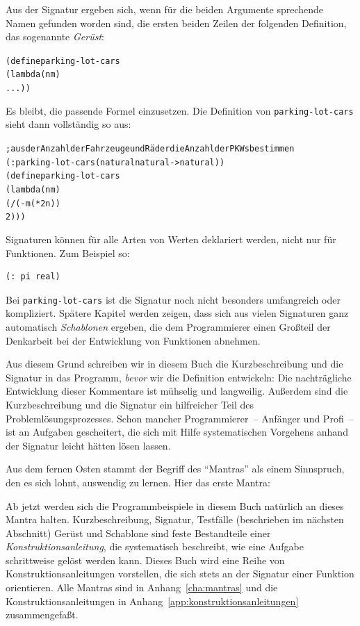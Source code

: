 Aus der Signatur ergeben sich, wenn für die beiden Argumente
sprechende Namen gefunden worden sind, die ersten beiden Zeilen der folgenden
Definition, das sogenannte \textit{Gerüst}:
%
\begin{alltt}
(define parking-lot-cars
  (lambda (n m)
    ...))
\end{alltt}
%
Es bleibt, die passende Formel einzusetzen.  Die Definition
von \texttt{parking-lot-cars} sieht dann vollständig so aus:
%
\begin{alltt}
; aus der Anzahl der Fahrzeuge und Räder die Anzahl der PKWs bestimmen
(: parking-lot-cars (natural natural -> natural))
(define parking-lot-cars
  (lambda (n m)
    (/ (- m (* 2 n))
       2)))
\end{alltt}
%
Signaturen können für alle Arten von Werten deklariert werden, nicht
nur für Funktionen.  Zum Beispiel so:
%
\begin{verbatim}
(: pi real)
\end{verbatim}
%
Bei \texttt{parking-lot-cars} ist die Signatur noch nicht besonders
umfangreich oder kompliziert.
Spätere Kapitel werden zeigen, dass sich aus vielen Signaturen ganz
automatisch \textit{Schablonen} ergeben, die dem
Programmierer einen Großteil der Denkarbeit bei der Entwicklung von
Funktionen abnehmen.

Aus diesem Grund schreiben wir in diesem Buch die
Kurzbeschreibung und die Signatur in das Programm, \emph{bevor} wir
die Definition entwickeln: 
Die
nachträgliche Entwicklung dieser Kommentare ist mühselig und
langweilig.  Außerdem sind die Kurzbeschreibung und die
Signatur ein hilfreicher Teil des Problemlösungsprozesses.
Schon mancher Programmierer~-- Anfänger und Profi~--
ist an Aufgaben gescheitert, die sich mit Hilfe systematischen Vorgehens
anhand der Signatur leicht hätten lösen lassen.

Aus dem fernen Osten stammt der Begriff des "`Mantras"' als einem
Sinnspruch, den es sich lohnt, auswendig zu lernen.  Hier das erste Mantra:
%
\begin{mantra}\label{mantra:contract}

\end{mantra}
%
Ab jetzt werden sich die Programmbeispiele in diesem Buch natürlich
an dieses Mantra halten.  Kurzbeschreibung, Signatur, Testfälle
(beschrieben im nächsten Abschnitt) Gerüst und
Schablone sind feste Bestandteile einer
\textit{Konstruktionsanleitung}, die
systematisch beschreibt, wie eine Aufgabe schrittweise gelöst werden
kann.  Dieses Buch wird eine Reihe von Konstruktionsanleitungen
vorstellen, die sich stets an der Signatur einer Funktion orientieren.
Alle Mantras sind in Anhang~\ref{cha:mantras} und die
Konstruktionsanleitungen in Anhang~\ref{app:konstruktionsanleitungen}
zusammengefaßt.

